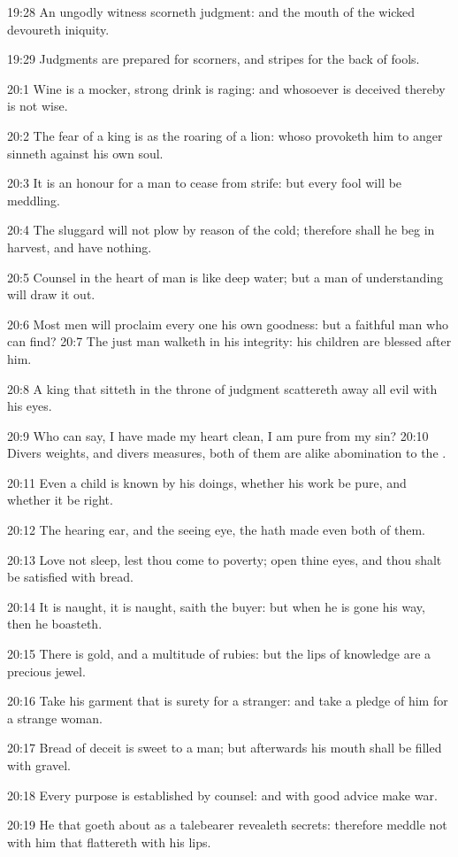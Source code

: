 19:28 An ungodly witness scorneth judgment: and the mouth of the wicked devoureth iniquity.

19:29 Judgments are prepared for scorners, and stripes for the back of fools.

20:1 Wine is a mocker, strong drink is raging: and whosoever is deceived thereby is not wise.

20:2 The fear of a king is as the roaring of a lion: whoso provoketh him to anger sinneth against his own soul.

20:3 It is an honour for a man to cease from strife: but every fool will be meddling.

20:4 The sluggard will not plow by reason of the cold; therefore shall he beg in harvest, and have nothing.

20:5 Counsel in the heart of man is like deep water; but a man of understanding will draw it out.

20:6 Most men will proclaim every one his own goodness: but a faithful man who can find?  20:7 The just man walketh in his integrity: his children are blessed after him.

20:8 A king that sitteth in the throne of judgment scattereth away all evil with his eyes.

20:9 Who can say, I have made my heart clean, I am pure from my sin?  20:10 Divers weights, and divers measures, both of them are alike abomination to the \LORD.

20:11 Even a child is known by his doings, whether his work be pure, and whether it be right.

20:12 The hearing ear, and the seeing eye, the \LORD hath made even both of them.

20:13 Love not sleep, lest thou come to poverty; open thine eyes, and thou shalt be satisfied with bread.

20:14 It is naught, it is naught, saith the buyer: but when he is gone his way, then he boasteth.

20:15 There is gold, and a multitude of rubies: but the lips of knowledge are a precious jewel.

20:16 Take his garment that is surety for a stranger: and take a pledge of him for a strange woman.

20:17 Bread of deceit is sweet to a man; but afterwards his mouth shall be filled with gravel.

20:18 Every purpose is established by counsel: and with good advice make war.

20:19 He that goeth about as a talebearer revealeth secrets: therefore meddle not with him that flattereth with his lips.

